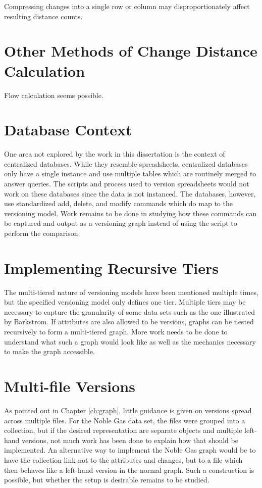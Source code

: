 Compressing changes into a single row or column may disproportionately affect resulting distance counts.

\section{Other Methods of Change Distance Calculation}

Flow calculation seems possible.

\section{Database Context}

One area not explored by the work in this dissertation is the context of centralized databases.
While they resemble spreadsheets, centralized databases only have a single instance and use multiple tables which are routinely merged to answer queries.
The scripts and process used to version spreadsheets would not work on these databases since the data is not instanced.
The databases, however, use standardized add, delete, and modify commands which do map to the versioning model.
Work remains to be done in studying how these commands can be captured and output as a versioning graph instead of using the script to perform the comparison.

\section{Implementing Recursive Tiers}

The multi-tiered nature of versioning models have been mentioned multiple times, but the specified versioning model only defines one tier.
Multiple tiers may be necessary to capture the granularity of some data sets such as the one illustrated by Barkstrom.
If attributes are also allowed to be versions, graphs can be nested recursively to form a multi-tiered graph.
More work needs to be done to understand what such a graph would look like as well as the mechanics necessary to make the graph accessible.

\section{Multi-file Versions}

As pointed out in Chapter \ref{ch:graph}, little guidance is given on versions spread across multiple files.
For the Noble Gas data set, the files were grouped into a collection, but if the desired representation are separate objects and multiple left-hand versions, not much work has been done to explain how that should be implemented.
An alternative way to implement the Noble Gas graph would be to have the collection link not to the attributes and changes, but to a file which then behaves like a left-hand version in the normal graph.
Such a construction is possible, but whether the setup is desirable remains to be studied.


